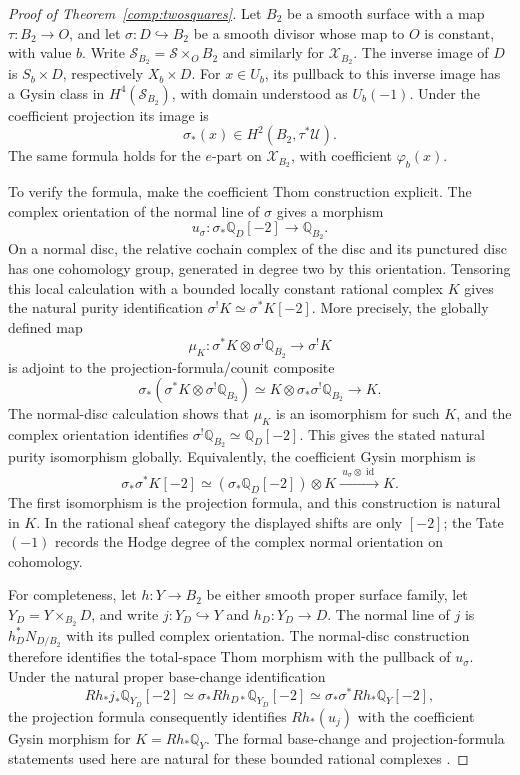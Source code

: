 \documentclass[11pt]{amsart}
\newcommand{\Q}{\mathbb Q}
\DeclareMathOperator{\id}{id}
\theoremstyle{definition}
\theoremstyle{remark}
\numberwithin{equation}{section}
\begin{document}
\begin{proof}[Proof of Theorem~\ref{comp:twosquares}]
Let $B_2$ be a smooth surface with a map
$\tau:B_2\to O$, and let $\sigma:D\hookrightarrow B_2$ be a smooth divisor
whose map to $O$ is constant, with value $b$.  Write
$\mathcal S_{B_2}=\mathcal S\times_OB_2$ and similarly for $\mathcal X_{B_2}$.
The inverse image of $D$ is $S_b\times D$, respectively $X_b\times D$.
For $x\in U_b$, its pullback to this inverse image has a Gysin class in
$H^4(\mathcal S_{B_2})$, with domain understood as $U_b(-1)$.  Under the
coefficient projection its image is
\begin{equation}\label{comp:thom}
 \sigma_*(x)\in H^2(B_2,\tau^*\mathscr U).
\end{equation}
The same formula holds for the $e$-part on $\mathcal X_{B_2}$, with coefficient
$\varphi_b(x)$.

To verify the formula, make the coefficient Thom construction explicit.
The complex orientation of the normal line of $\sigma$ gives a morphism
\[
 u_\sigma:\sigma_*\Q_D[-2]\longrightarrow\Q_{B_2}.
\]
On a normal disc, the relative cochain complex of the disc and its
punctured disc has one cohomology group, generated in degree two by
this orientation.  Tensoring this local calculation with a bounded
locally constant rational complex $K$ gives the natural purity
identification $\sigma^!K\simeq\sigma^*K[-2]$.  More precisely, the
globally defined map
\[
 \mu_K:\sigma^*K\otimes\sigma^!\Q_{B_2}\longrightarrow\sigma^!K
\]
is adjoint to the projection-formula/counit composite
\[
 \sigma_*(\sigma^*K\otimes\sigma^!\Q_{B_2})
 \simeq K\otimes\sigma_*\sigma^!\Q_{B_2}\longrightarrow K.
\]
The normal-disc calculation shows that $\mu_K$ is an isomorphism for
such $K$, and the complex orientation identifies
$\sigma^!\Q_{B_2}\simeq\Q_D[-2]$.  This gives the stated natural purity
isomorphism globally.  Equivalently, the coefficient Gysin morphism is
\[
 \sigma_*\sigma^*K[-2]
   \simeq (\sigma_*\Q_D[-2])\otimes K
   \xrightarrow{\ u_\sigma\otimes\id\ }K.
\]
The first isomorphism is the projection formula, and this construction
is natural in $K$.  In the rational sheaf category the displayed shifts
are only $[-2]$; the Tate $(-1)$ records the Hodge degree of the complex
normal orientation on cohomology.

For completeness, let $h:Y\to B_2$ be either smooth proper surface family,
let $Y_D=Y\times_{B_2}D$, and write $j:Y_D\hookrightarrow Y$ and
$h_D:Y_D\to D$.  The normal line of $j$ is $h_D^*N_{D/B_2}$ with its
pulled complex orientation.  The normal-disc construction therefore
identifies the total-space Thom morphism with the pullback of
$u_\sigma$.  Under the natural proper base-change identification
\[
 Rh_*j_*\Q_{Y_D}[-2]
   \simeq\sigma_*Rh_{D*}\Q_{Y_D}[-2]
   \simeq\sigma_*\sigma^*Rh_*\Q_Y[-2],
\]
the projection formula consequently identifies $Rh_*(u_j)$ with the
coefficient Gysin morphism for $K=Rh_*\Q_Y$.  The formal base-change and
projection-formula statements used here are natural for these bounded
rational complexes \cite[Theorems~5.10 and~6.3]{SchnuererSoergel}.


\end{proof}
\end{document}
